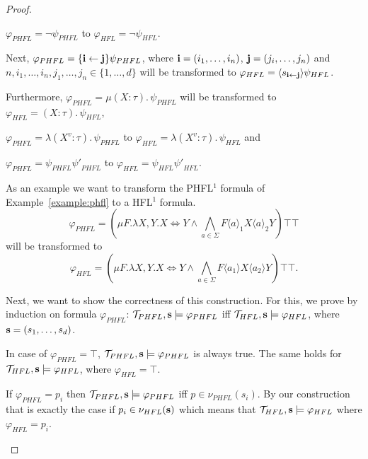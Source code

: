 \begin{proof}
\begin{compactitem}
        \item $\varphi_{PHFL} = \neg \psi_{PHFL}$ to $\varphi_{HFL} = \neg \psi_{HFL}$.

        \item Next, $\varphi_{PHFL} = \{\emph{i} \leftarrow \emph{j}\} \psi_{PHFL}$, where $\emph{i} = (i_1, \dots,
        i_n)$, $\emph{j} = (j_i, \dots, j_n)$ and $n, i_1, \dots, i_n, j_1, \dots, j_n \in \{1, \dots, d\}$ will be
        transformed to $\varphi_{HFL} = \langle s_{\emph{i} \leftarrow \emph{j}} \rangle \psi_{HFL}$.

        \item Furthermore, $\varphi_{PHFL} = \mu (X \colon \tau).\,\psi_{PHFL}$ will be transformed to $\varphi_{HFL}
        = (X \colon \tau).\,\psi_{HFL}$,

        \item $\varphi_{PHFL} = \lambda (X^v \colon \tau).\, \psi_{PHFL}$ to $\varphi_{HFL} = \lambda (X^v \colon \tau).\,
        \psi_{HFL}$ and

        \item $\varphi_{PHFL} = \psi_{PHFL}{\psi'}_{PHFL}$ to $\varphi_{HFL} = \psi_{HFL}{\psi'}_{HFL}$.
    \end{compactitem}

    As an example we want to transform the PHFL$^1$ formula of Example~\ref{example:phfl} to a HFL$^1$ formula.
    \[\varphi_{PHFL} = (\mu F. \lambda X, Y. X \Leftrightarrow Y \wedge \underset{a \in \Sigma}{\bigwedge} F
    \langle a \rangle_1 X \langle a \rangle_2 Y)\top \top\]
    will be transformed to
    \[\varphi_{HFL} = (\mu F. \lambda X, Y. X \Leftrightarrow Y \wedge \underset{a \in \Sigma}{\bigwedge} F \langle a_1
    \rangle X \langle a_2 \rangle Y)\top \top.\]

    Next, we want to show the correctness of this construction. For this, we prove by induction on formula
    $\varphi_{PHFL}$: $\mathcal{T}_{PHFL}, \emph{s} \models \varphi_{PHFL}$ iff $\mathcal{T}_{HFL}, \emph{s} \models
    \varphi_{HFL}$, where $\emph{s} = (s_1, \dots, s_d)$.
    \begin{compactitem}
        \item In case of $\varphi_{PHFL} = \top$, $\mathcal{T}_{PHFL}, \emph{s} \models \varphi_{PHFL}$
        is always true. The same holds for $\mathcal{T}_{HFL}, \emph{s} \models \varphi_{HFL}$, where $\varphi_{HFL} =
        \top$.

        \item If $\varphi_{PHFL} = p_i$ then $\mathcal{T}_{PHFL},
        \emph{s} \models \varphi_{PHFL}$ iff $p \in \nu_{PHFL}(s_i)$. By our construction that is exactly the case if
        $p_i \in \nu_{HFL}(\emph{s})$ which means that $\mathcal{T}_{HFL}, \emph{s} \models \varphi_{HFL}$ where
        $\varphi_{HFL} = p_i$.


\end{compactitem}
\end{proof}

